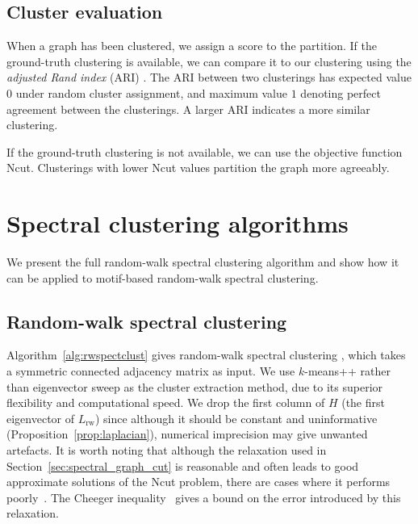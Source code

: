 \documentclass[12pt]{ociamthesis}
\theoremstyle{plain}
\theoremstyle{definition}
\theoremstyle{remark}
\begin{document}
\subsection{Cluster evaluation}

When a graph has been clustered, we assign a score to the partition. If the
ground-truth clustering is available, we can compare it to our clustering using
the \emph{adjusted Rand index} (ARI) \cite{hubert1985comparing}. The ARI
between two clusterings has expected value $0$ under random cluster assignment,
and maximum value $1$ denoting perfect agreement between the clusterings. A
larger ARI indicates a more similar clustering.

If the ground-truth clustering is not available, we can use the objective
function Ncut. Clusterings with lower Ncut values partition the graph more
agreeably.

\section{Spectral clustering algorithms} \label{sec:spectral_algs}

We present the full random-walk spectral clustering algorithm and show how it
can be applied to motif-based random-walk spectral clustering.

\subsection{Random-walk spectral clustering}

Algorithm~\ref{alg:rwspectclust} gives random-walk spectral clustering
\cite{von2007tutorial}, which takes a symmetric connected adjacency matrix as
input. We use $k$-means++ rather than eigenvector sweep as the cluster
extraction method, due to its superior flexibility and computational speed. We
drop the first column of $H$ (the first eigenvector of $L_\mathrm{rw}$) since
although it should be constant and uninformative
(Proposition~\ref{prop:laplacian}), numerical imprecision may give unwanted
artefacts. It is worth noting that although the relaxation used in
Section~\ref{sec:spectral_graph_cut} is reasonable and often leads to good
approximate solutions of the Ncut problem, there are cases where it performs
poorly~\cite{guattery1998quality}. The Cheeger
inequality~\cite{chung2005laplacians} gives a bound on the error introduced by
this relaxation.
\end{document}
